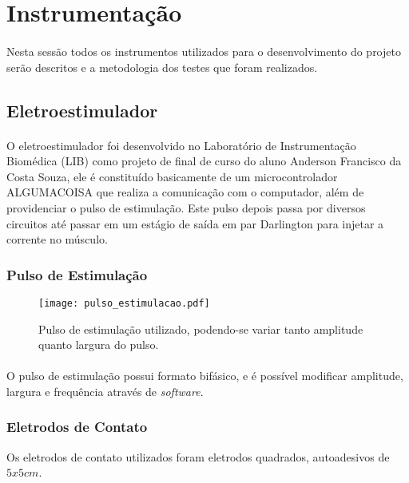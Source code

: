 \section{Instrumentação}
\paragraph{}Nesta sessão todos os instrumentos utilizados para o desenvolvimento do projeto serão descritos e a metodologia dos testes que foram realizados.

\subsection{Eletroestimulador}
\paragraph{}O eletroestimulador foi desenvolvido no Laboratório de Instrumentação Biomédica (LIB) como projeto de final de curso do aluno Anderson Francisco da Costa Souza\cite{Anderson34}, ele é constituído basicamente de um microcontrolador ALGUMACOISA que realiza a comunicação com o computador, além de providenciar o pulso de estimulação. Este pulso depois passa por diversos circuitos até passar em um estágio de saída em par Darlington para injetar a corrente no músculo.

\subsubsection{Pulso de Estimulação}

\begin{figure}[H]
	\centering
	\texttt{[image: pulso\_estimulacao.pdf]}
	\caption{Pulso de estimulação utilizado, podendo-se variar tanto amplitude quanto largura do pulso.}
	\label{fig:pulso_estimulacao}
\end{figure}

\paragraph{}O pulso de estimulação possui formato bifásico, e é possível modificar amplitude, largura e frequência através de \textit{software}.

\subsubsection{Eletrodos de Contato}
Os eletrodos de contato utilizados foram eletrodos quadrados, autoadesivos de $5 x 5 cm$.

